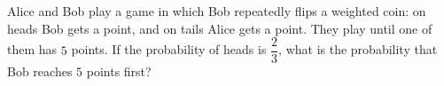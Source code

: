 Alice and Bob play a game in which Bob repeatedly flips a weighted coin: on heads Bob gets a point, and on tails Alice gets a point. They play until one of them has $5$ points. If the probability of heads is $\dfrac{2}{3}$, what is the probability that Bob reaches $5$ points first?

